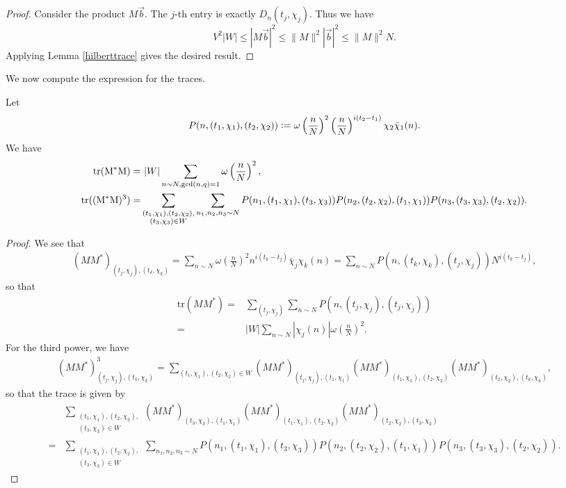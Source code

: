 \begin{proof}
    Consider the product $M\vec{b}$. The $j$-th entry is exactly $D_n(t_j,\chi_j)$. Thus we have \[
    V^2|W|\leq |M \vec{b}|^2 \leq \|M\|^2|\vec{b}|^2\leq \|M\|^2N.
    \]
    Applying Lemma \ref{hilberttrace} gives the desired result.
\end{proof}


We now compute the expression for the traces.
\begin{lemma}
    Let \[
    P(n,(t_1,\chi_1),(t_2,\chi_2))\mathrel{\mathop:}= \omega\left(\frac{n}{N}\right)^2 \left(\frac{n}{N}\right)^{i(t_2-t_1)}\chi_2\bar{\chi}_1(n).
    \]
    We have 
    \begin{align*}
        \rm{tr}(M^*M) = & \ |W|\sum_{n\sim N, \gcd (n,q)=1} \omega\left(\frac{n}{N}\right)^2, \\
        \rm{tr}((M^*M)^3)=&\sum_{\substack{(t_1,\chi_1),(t_2,\chi_2),\\(t_3,\chi_3)\in W}}\sum_{n_1,n_2,n_3\sim N} 
        P(n_1,(t_1,\chi_1),(t_3,\chi_3))P(n_2,(t_2,\chi_2),(t_1,\chi_1))P(n_3,(t_3,\chi_3),(t_2,\chi_2)).
    \end{align*}
\end{lemma}
\begin{proof}
    We see that \begin{align*}
        (MM^*)_{(t_j,\chi_j),(t_k,\chi_k)} = \sum_{n\sim N} \omega\left(\frac{n}{N}\right)^2 n^{i(t_k-t_j)}\bar{\chi}_j\chi_k(n) = \sum_{n\sim N}P(n,(t_k,\chi_k),(t_j,\chi_j))N^{i(t_k-t_j)},
    \end{align*}
    so that \begin{align*}
        \textrm{tr}(MM^*) =& \sum_{(t_j,\chi_j)} \sum_{n\sim N} P(n,(t_j,\chi_j),(t_j,\chi_j)) \\
        =&|W|\sum_{n\sim N} |\chi_j(n)|\omega\left(\frac{n}{N}\right)^2.
    \end{align*}
    For the third power, we have 
    \begin{align*}
        (MM^*)^3_{(t_j,\chi_j),(t_k,\chi_k)} = \sum_{(t_1,\chi_1),(t_2,\chi_2)\in W}   (MM^*)_{(t_j,\chi_j),(t_1,\chi_1)} (MM^*)_{(t_1,\chi_1),(t_2,\chi_2)} (MM^*)_{(t_2,\chi_2),(t_k,\chi_k)},
    \end{align*}
    so that the trace is given by \begin{align*}
        &\sum_{\substack{(t_1,\chi_1),(t_2,\chi_2),\\(t_3,\chi_3)\in W}} (MM^*)_{(t_3,\chi_3),(t_1,\chi_1)} (MM^*)_{(t_1,\chi_1),(t_2,\chi_2)} (MM^*)_{(t_2,\chi_2),(t_3,\chi_3)}\\
        =&\sum_{\substack{(t_1,\chi_1),(t_2,\chi_2),\\(t_3,\chi_3)\in W}} \sum_{n_1,n_2,n_3\sim N} 
        P(n_1,(t_1,\chi_1),(t_3,\chi_3))P(n_2,(t_2,\chi_2),(t_1,\chi_1))P(n_3,(t_3,\chi_3),(t_2,\chi_2)).
    \end{align*}
\end{proof}

